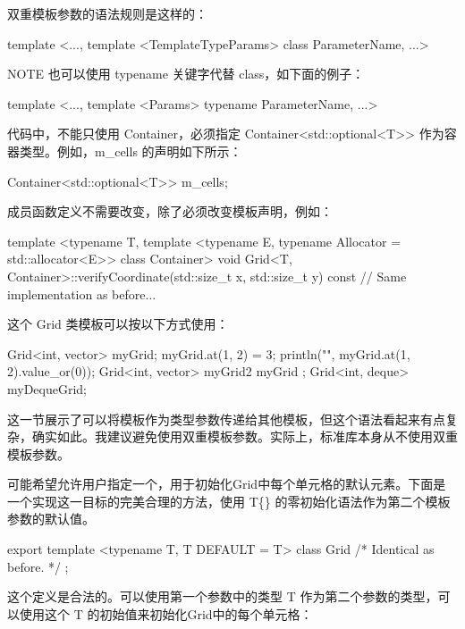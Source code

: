 双重模板参数的语法规则是这样的：

\begin{cpp}
template <..., template <TemplateTypeParams> class ParameterName, ...>
\end{cpp}

\begin{myNotic}{NOTE}
也可以使用 typename 关键字代替 class，如下面的例子：

\begin{cpp}
template <..., template <Params> typename ParameterName, ...>
\end{cpp}
\end{myNotic}

代码中，不能只使用 Container，必须指定 Container<std::optional<T>{}> 作为容器类型。例如，m\_cells 的声明如下所示：

\begin{cpp}
Container<std::optional<T>> m_cells;
\end{cpp}

成员函数定义不需要改变，除了必须改变模板声明，例如：

\begin{cpp}
template <typename T,
    template <typename E, typename Allocator = std::allocator<E>> class Container>
void Grid<T, Container>::verifyCoordinate(std::size_t x, std::size_t y) const
{
    // Same implementation as before...
}
\end{cpp}

这个 Grid 类模板可以按以下方式使用：

\begin{cpp}
Grid<int, vector> myGrid;
myGrid.at(1, 2) = 3;
println("{}", myGrid.at(1, 2).value_or(0));
Grid<int, vector> myGrid2 { myGrid };
Grid<int, deque> myDequeGrid;
\end{cpp}

这一节展示了可以将模板作为类型参数传递给其他模板，但这个语法看起来有点复杂，确实如此。我建议避免使用双重模板参数。实际上，标准库本身从不使用双重模板参数。


可能希望允许用户指定一个，用于初始化Grid中每个单元格的默认元素。下面是一个实现这一目标的完美合理的方法，使用 T\{\} 的零初始化语法作为第二个模板参数的默认值。

\begin{cpp}
export template <typename T, T DEFAULT = T{}>
class Grid { /* Identical as before. */ };
\end{cpp}

这个定义是合法的。可以使用第一个参数中的类型 T 作为第二个参数的类型，可以使用这个 T 的初始值来初始化Grid中的每个单元格：


